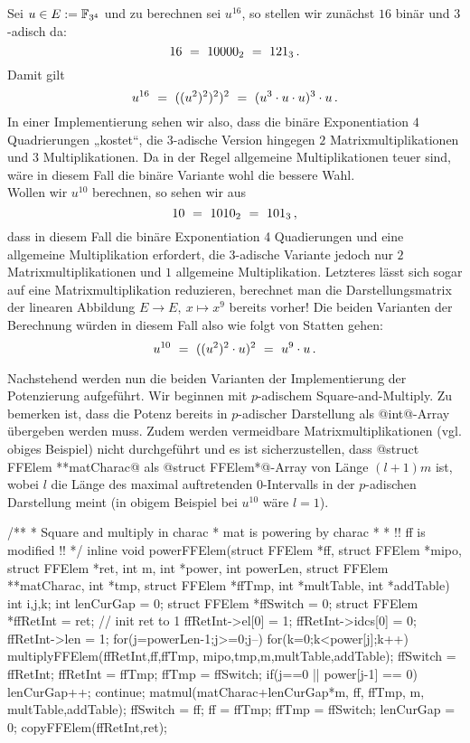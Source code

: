 \begin{beispiel}
  Sei $u \in E := \mathbb{F}_{3^4}$ und zu berechnen sei $u^{16}$, so stellen wir zunächst
  $16$ binär und $3$-adisch da:
  \[ 16 \ =\  10000_2 \ =\  121_3 \,.\]
  Damit gilt
  \[ u^{16} \ =\  ((u^2)^2)^2)^2 \ =\  (u^3\cdot u\cdot u)^3\cdot u\,.\]
  In einer Implementierung sehen wir also, dass die binäre Exponentiation 
  $4$ Quadrierungen „kostet“, die $3$-adische Version 
  hingegen $2$ Matrixmultiplikationen und $3$ Multiplikationen.
  Da in der Regel allgemeine Multiplikationen teuer sind, wäre in diesem Fall
  die binäre Variante wohl die bessere Wahl.\\
  Wollen wir $u^{10}$ berechnen, so sehen wir aus
  \[ 10 \ =\  1010_2 \ =\  101_3\,,\]
  dass in diesem Fall die binäre Exponentiation 4 Quadierungen und eine
  allgemeine Multiplikation erfordert, die $3$-adische Variante jedoch nur 
  $2$ Matrixmultiplikationen und $1$ allgemeine Multiplikation. Letzteres lässt
  sich sogar auf eine Matrixmultiplikation reduzieren, berechnet man die
  Darstellungsmatrix der linearen Abbildung $E\to E,\ x\mapsto x^9$ bereits
  vorher! Die beiden Varianten der Berechnung würden 
  in diesem Fall also wie folgt von Statten gehen:
  \[ u^{10} \ =\  ((u^2)^2\cdot u)^2 \ =\  u^9\cdot u\,.\]
\end{beispiel}

Nachstehend werden nun die beiden Varianten der Implementierung der Potenzierung
aufgeführt. Wir beginnen mit $p$-adischem Square-and-Multiply. Zu bemerken ist,
dass die Potenz bereits in $p$-adischer Darstellung als @int@-Array übergeben
werden muss. Zudem werden vermeidbare Matrixmultiplikationen (vgl. obiges
Beispiel) nicht durchgeführt und es ist sicherzustellen, 
dass @struct FFElem **matCharac@ als @struct FFElem*@-Array
von Länge $(l+1)m$ ist, wobei $l$ die Länge
des maximal auftretenden $0$-Intervalls in der $p$-adischen Darstellung meint 
(in obigem Beispiel bei $u^{10}$ wäre $l=1$).


\begin{ccode}[caption={Aus \url{../Sage/enumeratePCNs.c}},
  firstnumber=562, label=lst:powerffelem]
/**
 * Square and multiply in charac
 * mat is powering by charac
 *
 * !! ff is modified !!
 */
inline void powerFFElem(struct FFElem *ff, struct FFElem *mipo,
        struct FFElem *ret, 
        int m, int *power, int powerLen,
        struct FFElem **matCharac, int *tmp, struct FFElem *ffTmp,
        int *multTable, int *addTable){
    int i,j,k;
    int lenCurGap = 0;
    struct FFElem *ffSwitch = 0;
    struct FFElem *ffRetInt = ret;
    // init ret to 1
    ffRetInt->el[0] = 1; ffRetInt->idcs[0] = 0; ffRetInt->len = 1;
    for(j=powerLen-1;j>=0;j--){
        for(k=0;k<power[j];k++){
            multiplyFFElem(ffRetInt,ff,ffTmp, mipo,tmp,m,multTable,addTable);
            ffSwitch = ffRetInt; ffRetInt = ffTmp; ffTmp = ffSwitch;
        }
        if(j==0 || power[j-1] == 0){
            lenCurGap++;
            continue;
        }
        matmul(matCharac+lenCurGap*m, ff, ffTmp, m, multTable,addTable);
        ffSwitch = ff; ff = ffTmp; ffTmp = ffSwitch;
        lenCurGap = 0;
    }
    copyFFElem(ffRetInt,ret);
}
\end{ccode}



